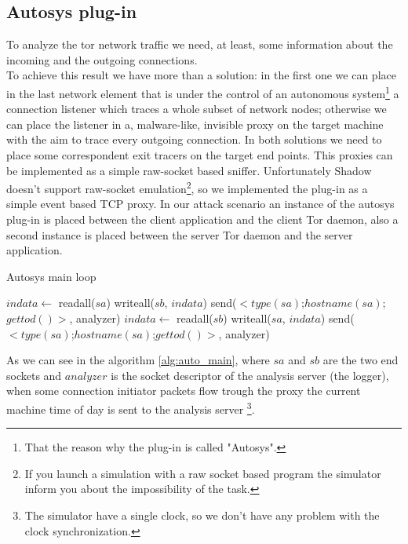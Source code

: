 \subsection{Autosys plug-in}
To analyze the tor network traffic we need, at least, some information about
the incoming and the outgoing connections.\\
To achieve this result we have more than a solution: in the first one we can place 
in the last network element that is under the control of an autonomous system\footnote{
That the reason why the plug-in is called "Autosys".} a connection
listener which traces a whole subset of
network nodes;
otherwise we can place the listener in a, malware-like, invisible proxy on the target
machine with the aim to trace every outgoing connection. 
In both solutions we need to place some correspondent exit tracers on
the target end points.
This proxies can be implemented as a simple raw-socket based sniffer. 
Unfortunately Shadow doesn't support raw-socket
emulation\footnote{If you launch a simulation with a raw socket based program the simulator
inform you about the impossibility of the task.},
so we implemented the plug-in as a simple event based TCP
proxy. In our attack scenario an instance of the autosys plug-in is placed 
between the client application and the client Tor daemon, also a second
 instance is placed between the server Tor daemon and the server application.
\\
\begin{algorithm}
\caption{Autosys main loop}
\begin{algorithmic}[1]
			\State $indata \gets $ readall($sa$)
			\State writeall($sb$, $indata$)
				\State send($<type(sa)$;$hostname(sa)$;$gettod()>$, analyzer)
			\EndIf
		\EndIf
			\State $indata \gets $ readall($sb$)
			\State writeall($sa$, $indata$)
				\State send($<type(sa)$;$hostname(sa)$;$gettod()>$, analyzer)
			\EndIf
		\EndIf
	\EndWhile
\EndFunction
\end{algorithmic}
\label{alg:auto_main}
\end{algorithm}

As we can see in the algorithm \ref{alg:auto_main}, where $sa$ and $sb$ are the two end sockets and
$analyzer$ is the socket descriptor of the analysis server (the logger), when some connection
initiator packets flow trough the proxy the
current machine time of day is sent to the analysis server
\footnote{The simulator have a single clock, so we don't have any problem with the
clock synchronization.}.

